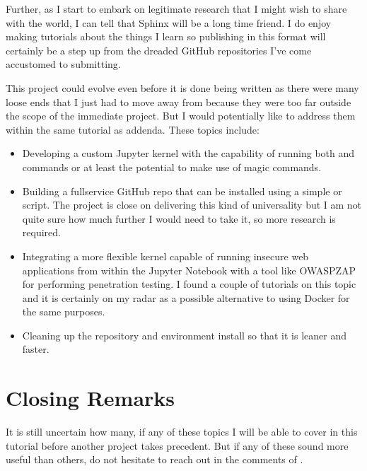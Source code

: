 \documentclass[letterpaper,12pt,english]{sphinxmanual}
\begin{document}
\sphinxAtStartPar
Further, as I start to embark on legitimate research that I might wish to share with the world, I can tell that Sphinx will be a long time friend. I do enjoy making tutorials about the things I learn so publishing in this format will certainly be a step up from the dreaded GitHub  repositories I’ve come accustomed to submitting.

\sphinxAtStartPar
This project could evolve even before it is done being written as there were many loose ends that I just had to move away from because they were too far outside the scope of the immediate project. But I would potentially like to address them within the same tutorial as addenda. These topics include:
\begin{itemize}
\item {} 
\sphinxAtStartPar
Developing a custom Jupyter kernel with the capability of running both  and  commands or at least the potential to make use of  magic commands.

\item {} 
\sphinxAtStartPar
Building a full\sphinxhyphen{}service GitHub repo that can be installed using a simple  or  script. The project is close on delivering this kind of universality but I am not quite sure how much further I would need to take it, so more research is required.

\item {} 
\sphinxAtStartPar
Integrating a more flexible  kernel capable of running insecure web applications from within the Jupyter Notebook with a tool like OWASP\sphinxhyphen{}ZAP for performing penetration testing. I found a couple of tutorials on this topic and it is certainly on my radar as a possible alternative to using Docker for the same purposes.

\item {} 
\sphinxAtStartPar
Cleaning up the repository and environment install so that it is leaner and faster.

\end{itemize}


\section{Closing Remarks}
\label{\detokenize{_notebooks/00-the-goal:closing-remarks}}
\sphinxAtStartPar
It is still uncertain how many, if any of these topics I will be able to cover in this tutorial before another project takes precedent. But if any of these sound more useful than others, do not hesitate to reach out in the comments of .
\end{document}
